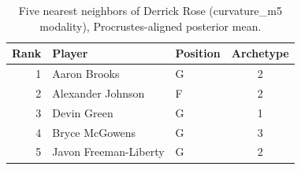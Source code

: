 \begin{table}[htbp]
  \centering\small
  \begin{tabular}{rllc}
    \toprule
    Rank & Player & Position & Archetype \\
    \midrule
    1 & Aaron Brooks & G & 2 \\
    2 & Alexander Johnson & F & 2 \\
    3 & Devin Green & G & 1 \\
    4 & Bryce McGowens & G & 3 \\
    5 & Javon Freeman-Liberty & G & 2 \\
    \bottomrule
  \end{tabular}
  \caption{Five nearest neighbors of Derrick Rose (curvature_m5 modality), Procrustes-aligned posterior mean.}
  \label{tab:Derrick_Rose_neighbors_curvature_m5}
\end{table}


